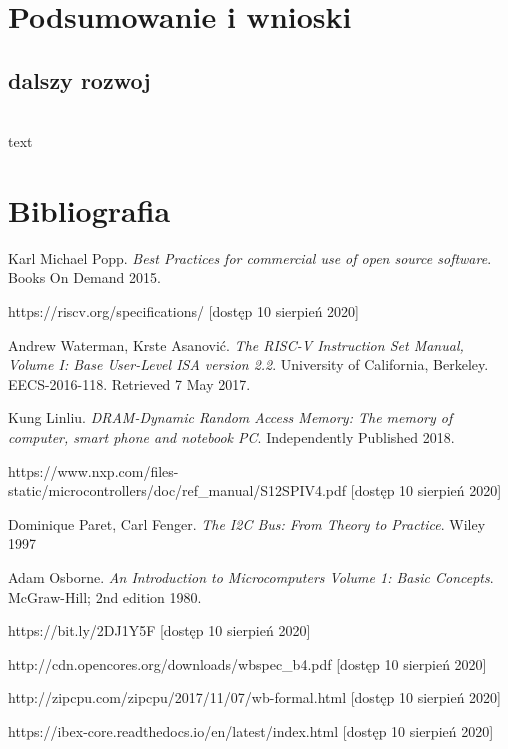 \documentclass[11pt,a4paper]{article}
\begin{document}
\section{Podsumowanie i wnioski}
	\subsection{dalszy rozwoj}
	\hspace{5mm}
		\\text

\newpage

\section{Bibliografia}

\begin{thebibliography}{10}

	 Karl Michael Popp. \textit{Best Practices for commercial use of open source software}. Books On Demand  2015.
	
	 https://riscv.org/specifications/ [dostęp 10 sierpień 2020]
	
	 Andrew Waterman, Krste Asanović. \textit{The RISC-V Instruction Set Manual, Volume I: Base User-Level ISA version 2.2}. University of California, Berkeley. EECS-2016-118. Retrieved 7 May 2017.
	
	 Kung Linliu. \textit{DRAM-Dynamic Random Access Memory: The memory of computer, smart phone and notebook PC}. Independently Published 2018.
	
	 https://www.nxp.com/files-static/microcontrollers/doc/ref\_manual/S12SPIV4.pdf [dostęp 10 sierpień 2020]
	
	 	Dominique Paret, Carl Fenger. \textit{The I2C Bus: From Theory to Practice}. Wiley 1997 
	
	 Adam Osborne. \textit{An Introduction to Microcomputers Volume 1: Basic Concepts}. McGraw-Hill; 2nd edition 1980.
	
	 https://bit.ly/2DJ1Y5F [dostęp 10 sierpień 2020]
	
	 http://cdn.opencores.org/downloads/wbspec\_b4.pdf [dostęp 10 sierpień 2020]
	
	 http://zipcpu.com/zipcpu/2017/11/07/wb-formal.html [dostęp 10 sierpień 2020]
	
	 https://ibex-core.readthedocs.io/en/latest/index.html [dostęp 10 sierpień 2020]
	

\end{thebibliography}
\end{document}
